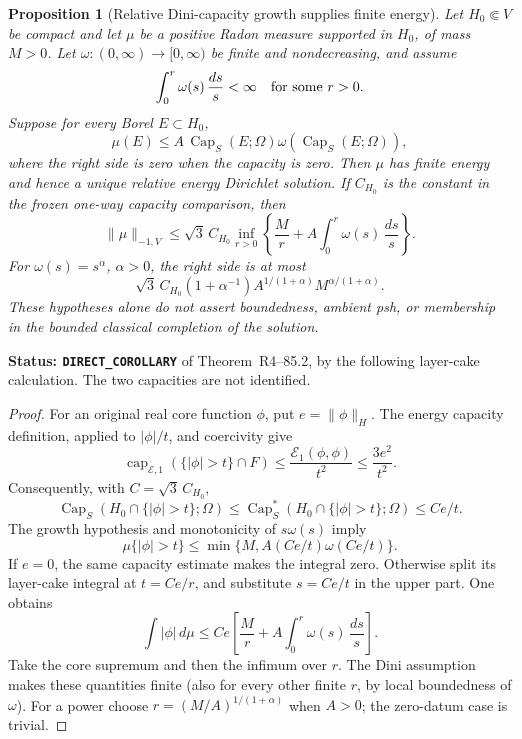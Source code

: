 \documentclass[11pt,a4paper]{article}
\numberwithin{equation}{section}
\newtheorem{proposition}[theorem]{Proposition}
\theoremstyle{definition}
\theoremstyle{remark}
\begin{document}
\begin{proposition}[Relative Dini-capacity growth supplies finite energy]
\label{prop:r6-dini-relative-energy-data}
Let $H_0\Subset V$ be compact and let $\mu$ be a positive Radon measure
supported in $H_0$, of mass $M>0$. Let $\omega:(0,\infty)\to[0,\infty)$
be finite and nondecreasing, and assume
\[
                    \int_0^r\omega(s)\,\frac{ds}{s}<\infty
                                      \quad\hbox{for some }r>0.
\]
Suppose for every Borel $E\subset H_0$,
\[
 \mu(E)\le A\,\operatorname{Cap}_S(E;\Omega)
                \omega(\operatorname{Cap}_S(E;\Omega)),
\]
where the right side is zero when the capacity is zero. Then $\mu$ has
finite energy and hence a unique relative energy Dirichlet solution.
If $C_{H_0}$ is the constant in the frozen one-way capacity comparison,
then
\begin{equation}
 \|\mu\|_{-1,V}
 \le\sqrt3\,C_{H_0}
       \inf_{r>0}\left\{\frac Mr+A\int_0^r\omega(s)\,\frac{ds}{s}\right\}.
 \label{eq:r6-dini-energy-norm}
\end{equation}
For $\omega(s)=s^\alpha$, $\alpha>0$, the right side is at most
\[
 \sqrt3\,C_{H_0}(1+\alpha^{-1})
                  A^{1/(1+\alpha)}M^{\alpha/(1+\alpha)}.
\]
These hypotheses alone do not assert boundedness, ambient psh, or
membership in the bounded classical completion of the solution.
\end{proposition}

\noindent\textbf{Status: \texttt{DIRECT\_COROLLARY}} of
Theorem~\textup{R4--85.2}, by the following layer-cake
calculation. The two capacities are not identified.

\begin{proof}
For an original real core function $\phi$, put $e=\|\phi\|_H$.
The energy capacity definition, applied to $|\phi|/t$, and coercivity
give
\[
 \operatorname{cap}_{\mathcal E,1}(\{|\phi|>t\}\cap F)
       \le\frac{\mathcal E_1(\phi,\phi)}{t^2}
       \le\frac{3e^2}{t^2}.
\]
Consequently, with $C=\sqrt3\,C_{H_0}$,
\[
 \operatorname{Cap}_S(H_0\cap\{|\phi|>t\};\Omega)
       \le \operatorname{Cap}_S^*(H_0\cap\{|\phi|>t\};\Omega)
       \le Ce/t.
\]
The growth hypothesis and monotonicity of $s\omega(s)$ imply
\[
          \mu\{|\phi|>t\}
                 \le\min\{M,A(Ce/t)\omega(Ce/t)\}.
\]
If $e=0$, the same capacity estimate makes the integral zero. Otherwise
split its layer-cake integral at $t=Ce/r$, and substitute $s=Ce/t$
in the upper part. One obtains
\[
 \int|\phi|\,d\mu
       \le Ce\left[\frac Mr+A\int_0^r\omega(s)\,\frac{ds}{s}\right].
\]
Take the core supremum and then the infimum over $r$. The Dini
assumption makes these quantities finite (also for every other finite
$r$, by local boundedness of $\omega$). For a power choose
$r=(M/A)^{1/(1+\alpha)}$ when $A>0$; the zero-datum case is trivial.
\end{proof}
\end{document}
